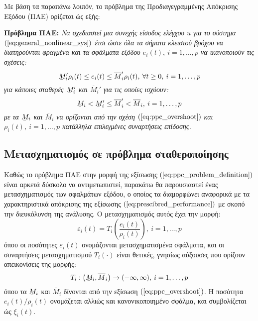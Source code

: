 Με βάση τα παραπάνω λοιπόν, το πρόβλημα της Προδιαγεγραμμένης Απόκρισης Εξόδου (ΠΑΕ) ορίζεται ώς εξής: 

\textbf{Πρόβλημα ΠΑΕ:}
\textit{ Να σχεδιαστεί μια συνεχής είσοδος ελέγχου $u$ για το σύστημα $(\ref{eq:general_nonlinear_sys})$ έτσι ώστε όλα τα σήματα κλειστού βρόχου να διατηρούνται φραγμένα και τα σφάλματα εξόδου $e_i(t), \: i = 1,\dots ,p$ να ικανοποιούν τις σχέσεις:
\begin{equation}
	\barbelow{M}_i' \rho_i(t) \leq e_i(t) \leq \overline{M}_i'  \rho_i(t),
	\: \forall t \geq 0, \: i = 1,\dots ,p
	\label{eq:ppc_problem_definition}
\end{equation}
για κάποιες σταθερές $\barbelow{M}_i'$ και $\overline{M}_i'$ για τις οποίες ισχύουν:
\begin{equation*}
	\barbelow{M}_i < \barbelow{M}_i' \leq \overline{M}_i' < \overline{M}_i, \: i = 1,\dots ,p
\end{equation*}
με τα $\barbelow{M}_i$ και $\overline{M}_i$ να ορίζονται από την σχέση $(\ref{eq:ppc_overshoot})$ και $\rho_i(t), \: i = 1,\dots ,p$ κατάλληλα επιλεγμένες συναρτήσεις επίδοσης.
}

\subsection{Μετασχηματισμός σε πρόβλημα σταθεροποίησης}
Καθώς το πρόβλημα ΠΑΕ στην μορφή της εξίσωσης $(\ref{eq:ppc_problem_definition})$ είναι αρκετά δύσκολο να αντιμετωπιστεί, παρακάτω θα παρουσιαστεί ένας μετασχηματισμός των σφαλμάτων εξόδου, ο οποίος τα διαμορφώνει αναφορικά με τα χαρακτηριστικά απόκρισης της εξίσωσης $(\ref{eq:prescibred_performance})$ με σκοπό την διευκόλυνση της ανάλυσης. Ο μετασχηματισμός αυτός έχει την μορφή:
\begin{equation}
	\varepsilon_i(t) = T_i \left( \frac{e_i(t)}{\rho_i(t)} \right)
	, \: i = 1,\dots ,p
	\label{eq:ppc_trasformation_error}
\end{equation}
όπου οι ποσότητες $\varepsilon_i(t)$ ονομάζονται μετασχηματισμένα σφάλματα, και οι συναρτήσεις μετασχηματισμού $T_i(\cdot)$ είναι θετικές, γνησίως αύξουσες που ορίζουν απεικονίσεις της μορφής:
\begin{equation*}
	T_i: \left( \barbelow{M}_i, \overline{M}_i\right) \rightarrow 
	(- \infty, \infty), \: i = 1,\dots ,p
\end{equation*}
όπου τα $\barbelow{M}_i$ και  $\overline{M}_i$ δίνονται από την εξίσωση $(\ref{eq:ppc_overshoot})$. Η ποσότητα $e_i(t)/\rho_i(t)$ ονομάζεται αλλιώς και κανονικοποιημένο σφάλμα, και συμβολίζεται ώς $\xi_i(t)$.

